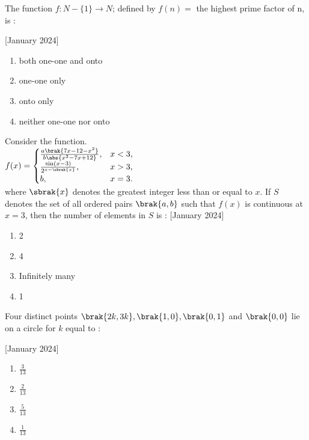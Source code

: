 \iffalse
\title{2024}
\author{EE24BTECH11066}
\section{mcq-single}
\fi
\item The function $f  : N-{\{1}\}\rightarrow N$; defined by $f(n)=$ the highest prime factor of n, is :    
    
    \hfill{[January 2024]}
\begin{enumerate}
    \item both one-one and onto
    \item one-one only
    \item onto only
    \item neither one-one nor onto
\end{enumerate}

\item Consider the function.\\
$f(x)= \begin{cases} 
\frac{a \brak{7x - 12 - x^2}}{b\abs{x^2 - 7x + 12}}, & x < 3, \\
\frac{\sin(x - 3)}{2^{x - \sbrak{x}}}, & x > 3, \\
b, & x = 3.
\end{cases}
$\\
where $\sbrak{x}$ denotes the greatest integer less than or equal to $x$. If $S$ denotes the set of all ordered pairs $\brak{a,b}$ such that $f(x)$ is continuous at $x=3$, then the number of elements in $S$ is : \hfill{[January 2024]}
\begin{enumerate}
    \item 2
    \item 4
    \item Infinitely many
    \item 1
\end{enumerate}

\item Four distinct points $\brak{2k,3k}, \brak{1,0}, \brak{0,1}$ and $\brak{0,0}$ lie on a circle for $k$ equal to :

    \hfill{[January 2024]}
\begin{enumerate}
    \item $\frac{3}{13}$\\
    \item $\frac{2}{13}$\\
    \item $\frac{5}{13}$\\
    \item $\frac{1}{13}$
\end{enumerate}


